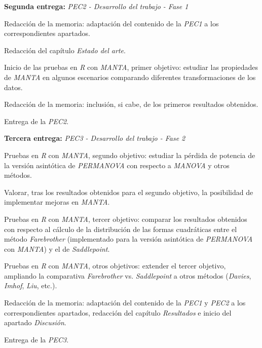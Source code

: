 \documentclass[IB,BIB]{TFUOC}%
\newcommand{\checkbox}{\text{\fboxsep=-.15pt\fbox{\rule{0pt}{1.5ex}\rule{1.5ex}{0pt}}}} %
\newcommand{\cmark}{\ding{51}} %
\newcommand{\xmark}{\ding{55}} %
\newcommand{\progress}{\ding{46}} %
\newcommand{\done}{\rlap{\checkbox}{\raisebox{1.2pt}{\large\hspace{1pt}\cmark}}
\hspace{-2.5pt}}
\newcommand{\wontfix}{\rlap{\checkbox}{\raisebox{-1.5pt}{\large\hspace{-.75pt}\xmark}}
\hspace{-2.5pt}}
\newcommand{\progresss}{\rlap{\checkbox}{\raisebox{1.5pt}{\large\hspace{-7pt}\progress}}
\hspace{-2.5pt}}
\begin{document}
\begin{todolist}
  \item[\progresss] \textbf{Segunda entrega:} \textit{PEC2 - Desarrollo del trabajo - Fase 1}
  \begin{todolist}
  \item[\done] Redacción de la memoria: adaptación del contenido de la \textit{PEC1} a los correspondientes apartados.
  \item[\progresss] Redacción del capítulo \textit{Estado del arte}.
  \item[\progresss] Inicio de las pruebas en \textit{R} con \textit{MANTA}, primer objetivo: estudiar las propiedades de \textit{MANTA} en algunos escenarios comparando diferentes transformaciones de los datos.
  \item[\wontfix] Redacción de la memoria: inclusión, si cabe, de los primeros resultados obtenidos.
  \item[\progresss] Entrega de la \textit{PEC2}.
  \end{todolist}
\end{todolist}

\begin{todolist}
  \item \textbf{Tercera entrega:} \textit{PEC3 - Desarrollo del trabajo - Fase 2}
  \begin{todolist}
  \item Pruebas en \textit{R} con \textit{MANTA}, segundo objetivo: estudiar la pérdida de potencia de la versión asintótica de \textit{PERMANOVA} con respecto a \textit{MANOVA} y otros métodos.
  \item Valorar, tras los resultados obtenidos para el segundo objetivo, la posibilidad de implementar mejoras en \textit{MANTA}.
  \item Pruebas en \textit{R} con \textit{MANTA}, tercer objetivo: comparar los resultados obtenidos con respecto al cálculo de la distribución de las formas cuadráticas entre el método \textit{Farebrother} (implementado para la versión asintótica de \textit{PERMANOVA} con \textit{MANTA}) y el de \textit{Saddlepoint}.
  \item Pruebas en \textit{R} con \textit{MANTA}, otros objetivos: extender el tercer objetivo, ampliando la comparativa \textit{Farebrother} vs. \textit{Saddlepoint} a otros métodos (\textit{Davies}, \textit{Imhof}, \textit{Liu}, etc.).
  \item Redacción de la memoria: adaptación del contenido de la \textit{PEC1} y \textit{PEC2} a los correspondientes apartados, redacción del capítulo \textit{Resultados} e inicio del apartado \textit{Discusión}.
  \item Entrega de la \textit{PEC3}.
  \end{todolist}
\end{todolist}
\end{document}
